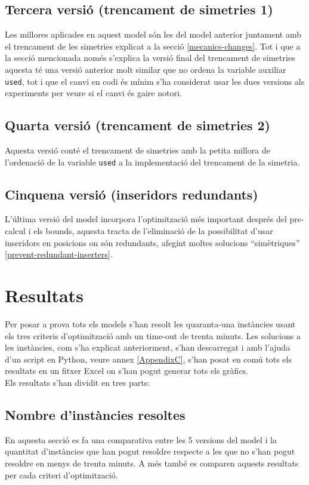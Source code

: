 \subsection{Tercera versió (trencament de simetries 1)}
Les millores aplicades en aquest model són les del model anterior juntament amb el trencament de les simetries explicat a la secció \ref{mecanics-changes}. Tot i que a la secció mencionada només s'explica la versió final del trencament de simetries aquesta té una versió anterior molt similar que no ordena la variable auxiliar \lstinline{used}, tot i que el canvi en codi és mínim s'ha considerat usar les dues versions als experiments per veure si el canvi és gaire notori.

\subsection{Quarta versió (trencament de simetries 2)}
Aquesta versió conté el trencament de simetries amb la petita millora de l'ordenació de la variable \lstinline{used} a la implementació del trencament de la simetria.

\subsection{Cinquena versió (inseridors redundants)}
L'última versió del model incorpora l'optimització més important després del pre-calcul i els bounds, aquesta tracta de l'eliminació de la possibilitat d'usar inseridors en posicions on són redundants, afegint moltes solucions ``simètriques'' \ref{prevent-redundant-inserters}.

\section{Resultats}
Per posar a prova tots els models s'han resolt les quaranta-una instàncies usant els tres criteris d'optimització amb un time-out de trenta minuts. Les solucions a les instàncies, com s'ha explicat anteriorment, s'han descarregat i amb l'ajuda d'un script en Python, veure annex \ref{AppendixC}, s'han posat en comú tots els resultats en un fitxer Excel on s'han pogut generar tots els gràfics.\\
Els resultats s'han dividit en tres parts:
\subsection{Nombre d'instàncies resoltes}\label{subsec:instances-solved}
En aquesta secció es fa una comparativa entre les 5 versions del model i la quantitat d'instàncies que han pogut resoldre respecte a les que no s'han pogut resoldre en menys de trenta minuts. A més també es comparen aquests resultats per cada criteri d'optimització.


